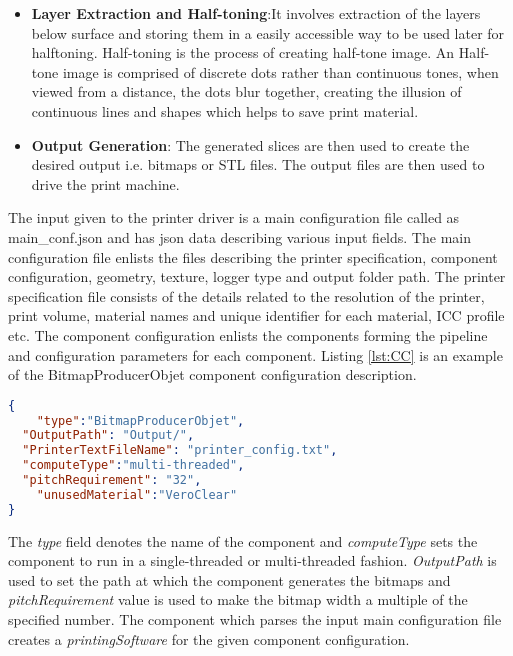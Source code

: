 \begin{itemize}
\item \textbf{Layer Extraction and Half-toning}:It involves extraction of the layers below surface and storing them in a easily accessible way to be used later for halftoning. Half-toning is the process of creating half-tone image. An Half-tone image is comprised of discrete dots rather than continuous tones, when viewed from a distance, the dots blur together, creating the illusion of continuous lines and shapes which helps to save print material. \newline

\item \textbf{Output Generation}: The generated slices are then used to create the desired output i.e. bitmaps or STL files. The output files are then used to drive the print machine. \newline

\end{itemize} 

The input given to the printer driver is a main configuration file called as main\_conf.json and has json data describing various input fields. The main configuration file enlists the files describing the printer specification, component configuration, geometry, texture, logger type and output folder path. The printer specification file consists of the details related to the resolution of the printer, print volume, material names and unique identifier for each material, ICC profile etc. The component configuration enlists the components forming the pipeline and configuration parameters for each component. Listing \ref{lst:CC} is an example of the BitmapProducerObjet component configuration description. \newline

\begin{lstlisting}[language=json,label={lst:CC},caption={BitmapProducerObjet Component Configuration}]
{
	"type":"BitmapProducerObjet",
  "OutputPath": "Output/",
  "PrinterTextFileName": "printer_config.txt",
  "computeType":"multi-threaded",
  "pitchRequirement": "32",
	"unusedMaterial":"VeroClear"
}
\end{lstlisting}

The \textit{type} field denotes the name of the component and \textit{computeType} sets the component to run in a single-threaded or multi-threaded fashion. \textit{OutputPath} is used to set the path at which the component generates the bitmaps and \textit{pitchRequirement} value is used to make the bitmap width a multiple of the specified number. The component which parses the input main configuration file creates a \textit{printingSoftware} for the given component configuration. 

